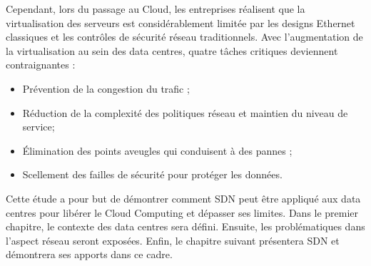 \par
Cependant, lors du passage au Cloud, les entreprises réalisent que la virtualisation des serveurs est considérablement limitée par les designs Ethernet classiques et les contrôles de sécurité réseau traditionnels. Avec l'augmentation de la virtualisation au sein des data centres, quatre tâches critiques deviennent contraignantes :
\begin{itemize}
\item Prévention de la congestion du trafic ;
\item Réduction de la complexité des politiques réseau et maintien du niveau de service;
\item Élimination des points aveugles qui conduisent à des pannes ;
\item  Scellement des failles de sécurité pour protéger les données. \cite{virtualizedCCCC}\\
\end{itemize}

\par
Cette étude a pour but de démontrer comment SDN peut être appliqué aux data centres pour libérer le Cloud Computing et dépasser ses limites. Dans le premier chapitre, le contexte des data centres sera défini. Ensuite, les problématiques dans l'aspect réseau seront exposées. Enfin, le chapitre suivant présentera SDN et démontrera ses apports dans ce cadre.

